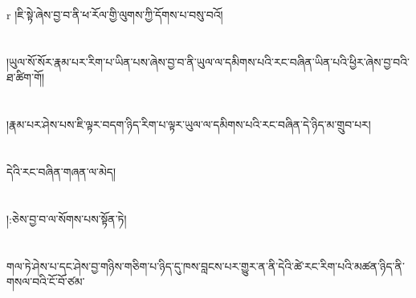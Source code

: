 r{ }།ཇི་སྟེ་ཞེས་བྱ་བ་ནི་ཕ་རོལ་གྱི་ལུགས་ཀྱི་དོགས་པ་བསུ་བའོ།\chapter{ }།ཡུལ་སོ་སོར་རྣམ་པར་རིག་པ་ཡིན་པས་ཞེས་བྱ་བ་ནི་ཡུལ་ལ་དམིགས་པའི་རང་བཞིན་ཡིན་པའི་ཕྱིར་ཞེས་བྱ་བའི་ཐ་ཚིག་གོ།\chapter{ }།རྣམ་པར་ཤེས་པས་ཇི་ལྟར་བདག་ཉིད་རིག་པ་ལྟར་ཡུལ་ལ་དམིགས་པའི་རང་བཞིན་དེ་ཉིད་མ་གྲུབ་པར།\chapter{ }དེའི་རང་བཞིན་གཞན་ལ་མེད།\chapter{ }།:ཅེས་བྱ་བ་ལ་སོགས་པས་སྟོན་ཏེ།\chapter{ }གལ་ཏེ་ཤེས་པ་དང་ཤེས་བྱ་གཉིས་གཅིག་པ་ཉིད་དུ་ཁས་བླངས་པར་གྱུར་ན་ནི་དེའི་ཚེ་རང་རིག་པའི་མཚན་ཉིད་ནི་གསལ་བའི་ངོ་བོ་ཙམ་
